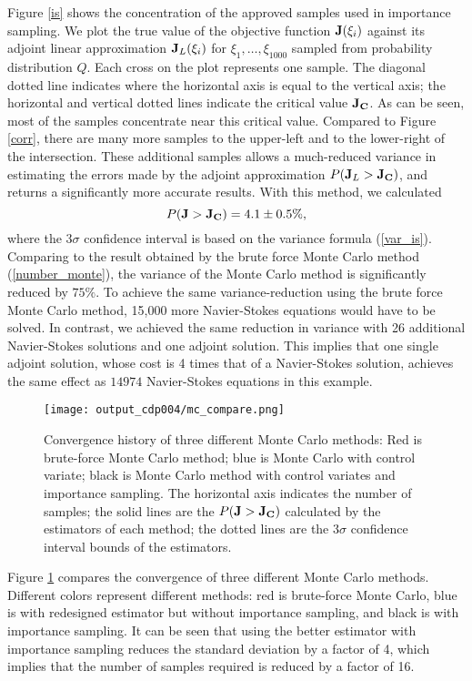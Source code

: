 Figure \ref{is} shows the concentration of the approved samples used in
importance sampling.
We plot the true value of the objective function ${\bf J}(\xi_i)$ against its
adjoint linear approximation ${\bf J}_L(\xi_i)$ for
$\xi_1, \ldots, \xi_{1000}$ sampled from probability distribution $Q$.
Each cross on the plot represents one sample.
The diagonal dotted line indicates where the horizontal axis is equal to the
vertical axis; the horizontal and vertical dotted lines indicate the critical
value ${\bf J_C}$.  As can be seen, most of the samples concentrate near this
critical value.  Compared to Figure \ref{corr}, there are many more samples
to the upper-left and to the lower-right of the intersection.  These additional
samples allows a much-reduced variance in estimating the errors made by the
adjoint approximation $P({\bf J}_L > {\bf J_C})$, and returns a significantly
more accurate results.  With this method, we calculated
\begin{equation} \label{result_importance_samp}
 P({\bf J} > {\bf J_C}) = 4.1 \pm 0.5 \%,
\end{equation}
where the $3\sigma$ confidence interval is based on the variance formula
(\ref{var_is}).  Comparing to the result obtained by the brute force Monte Carlo
method (\ref{number_monte}), the variance of the Monte
Carlo method is significantly reduced by $75\%$.
To achieve the same variance-reduction using the brute force Monte
Carlo method, 15,000 more Navier-Stokes equations would have to be solved.
In contrast, we achieved the same reduction in variance with
26 additional Navier-Stokes solutions and one adjoint solution.
This implies that one single adjoint solution, whose cost is 4 times that of
a Navier-Stokes solution, achieves the same effect as $14974$ Navier-Stokes
equations in this example.

\begin{figure}[htb!]\center
\texttt{[image: output\_cdp004/mc\_compare.png]}
\caption{Convergence history of three different Monte Carlo methods:
         Red is brute-force Monte Carlo method;
         blue is Monte Carlo with control variate;
         black is Monte Carlo method with control variates
         and importance sampling.
         The horizontal axis indicates the number of samples;
         the solid lines are the $P({\bf J} > {\bf J_C})$ calculated by
         the estimators of each method; the dotted lines are the $3\sigma$
         confidence interval bounds of the estimators.}
 \label{compare}
\end{figure}
Figure \ref{compare} compares the convergence of three different Monte Carlo
methods.  Different colors represent different methods: red is brute-force
Monte Carlo, blue is with redesigned estimator but without importance
sampling, and black is with importance sampling.
It can be seen that using the better estimator with importance sampling reduces
the standard deviation by a factor of 4, which implies that the number of
samples required is reduced by a factor of 16.


